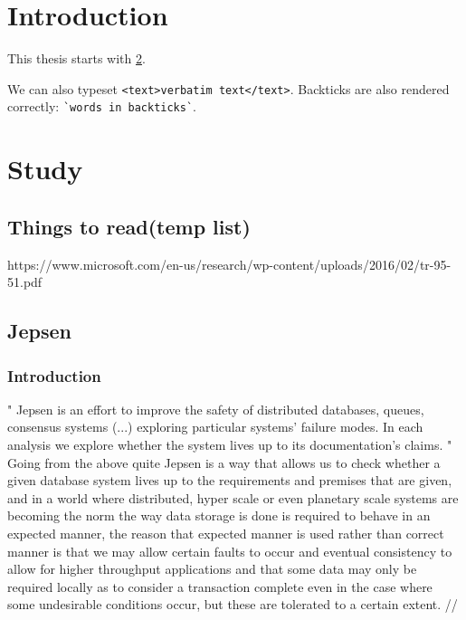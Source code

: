 \documentclass[
  a4paper,  %
  twoside,  %
  bibliography=totoc,
  headsepline,
  cleardoublepage=empty,
  parskip=half,
  draft=false
]{scrbook}
\begin{document}


\renewcommand*{\chapterpagestyle}{scrplain}
\pagestyle{scrheadings}
\pagestyle{scrheadings}
\ihead[]{}
\chead[]{}
\ohead[]{\headmark}
\cfoot[]{}
\ifoot[]{}






%
%


\chapter{Introduction}

This thesis starts with \cref{chap:k2}.

We can also typeset \verb|<text>verbatim text</text>|.
Backticks are also rendered correctly: \verb|`words in backticks`|.

\chapter{Study}
\label{chap:k2}

\section{Things to read(temp list)}

https://www.microsoft.com/en-us/research/wp-content/uploads/2016/02/tr-95-51.pdf


\section{Jepsen}
\subsection{Introduction}
"
Jepsen is an effort to improve the safety of distributed databases, queues, consensus systems  (...) exploring particular systems’ failure modes. In each analysis we explore whether the system lives up to its documentation’s claims.
"\cite{jepsonio}
\\

Going from the above quite Jepsen is a way that allows us to check whether a given database system lives up to the requirements and premises that are given, and in a world where distributed, hyper scale or even planetary scale systems are becoming the norm the way data storage is done is required to behave in an expected manner, the reason that expected manner is used rather than correct manner is that we may allow certain faults to occur and eventual consistency to allow for higher throughput applications and that some data may only be required locally as to consider a transaction complete even in the case where some undesirable conditions occur, but these are tolerated to a certain extent. //
\end{document}
